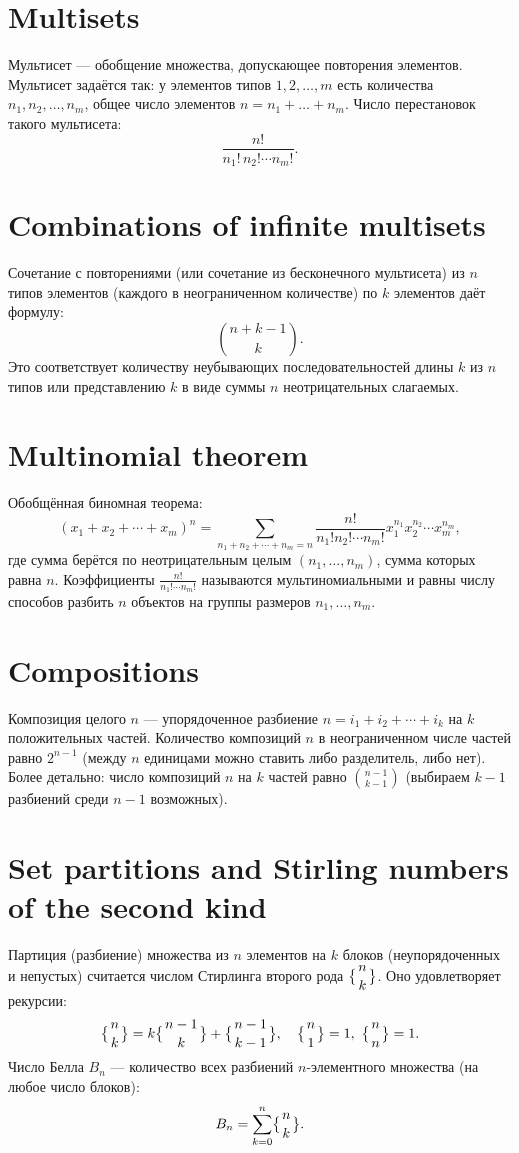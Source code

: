 \documentclass{article}
\begin{document}
\section{Multisets}
Мультисет --- обобщение множества, допускающее повторения элементов. Мультисет задаётся так: у элементов типов $1,2,\dots,m$ есть количества $n_1,n_2,\dots,n_m$, общее число элементов $n=n_1+\dots +n_m$. Число перестановок такого мультисета:
\[
\frac{n!}{n_1!\,n_2!\cdots n_m!}.
\]

\section{Combinations of infinite multisets}
Сочетание с повторениями (или сочетание из бесконечного мультисета) из $n$ типов элементов (каждого в неограниченном количестве) по $k$ элементов даёт формулу:
\[
\binom{n+k-1}{k}.
\]
Это соответствует количеству неубывающих последовательностей длины $k$ из $n$ типов или представлению $k$ в виде суммы $n$ неотрицательных слагаемых.

\section{Multinomial theorem}
Обобщённая биномная теорема:
\[
(x_1 + x_2 + \cdots + x_m)^n = \sum_{n_1+n_2+\cdots+n_m=n} \frac{n!}{n_1!n_2!\cdots n_m!} x_1^{n_1}x_2^{n_2}\cdots x_m^{n_m},
\]
где сумма берётся по неотрицательным целым $(n_1,\dots,n_m)$, сумма которых равна $n$. Коэффициенты $\displaystyle \frac{n!}{n_1!\cdots n_m!}$ называются мультиномиальными и равны числу способов разбить $n$ объектов на группы размеров $n_1,\dots,n_m$.

\section{Compositions}
Композиция целого $n$ --- упорядоченное разбиение $n = i_1 + i_2 + \cdots + i_k$ на $k$ положительных частей. Количество композиций $n$ в неограниченном числе частей равно $2^{n-1}$ (между $n$ единицами можно ставить либо разделитель, либо нет). Более детально: число композиций $n$ на $k$ частей равно $\displaystyle \binom{n-1}{k-1}$ (выбираем $k-1$ разбиений среди $n-1$ возможных).

\section{Set partitions and Stirling numbers of the second kind}
Партиция (разбиение) множества из $n$ элементов на $k$ блоков (неупорядоченных и непустых) считается числом Стирлинга второго рода $\displaystyle \bigl\{{n\atop k}\bigr\}$. Оно удовлетворяет рекурсии:
\[
\bigl\{{n\atop k}\bigr\} = k\bigl\{{n-1\atop k}\bigr\} + \bigl\{{n-1\atop k-1}\bigr\}, 
\quad \bigl\{{n\atop 1}\bigr\}=1,\ \bigl\{{n\atop n}\bigr\}=1.
\]
Число Белла $B_n$ --- количество всех разбиений $n$-элементного множества (на любое число блоков):
\[
B_n = \sum_{k=0}^n \bigl\{{n\atop k}\bigr\}.
\]
\end{document}
